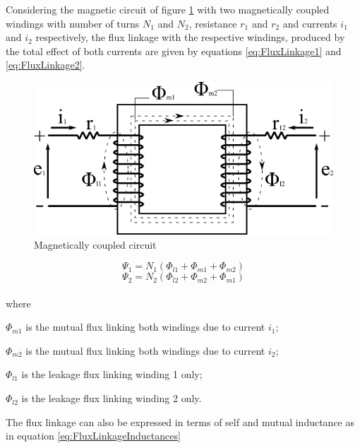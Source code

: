 Considering the magnetic circuit of figure \ref{fig:MagneticCircuit} with two magnetically coupled windings with number of turns $N_1$ and $N_2$, resistance $r_1$ and $r_2$ and currents $i_1$ and $i_2$ respectively, the flux linkage with the respective windings, produced by the total effect of both currents are given by equations \ref{eq:FluxLinkage1} and \ref{eq:FluxLinkage2}.

\begin{figure}[h]
	\centering
	\includegraphics[scale=0.6]{img/MagneticCircuit.png} 
	\caption{Magnetically coupled circuit}
	\label{fig:MagneticCircuit}
\end{figure}

\begin{equation} \label{eq:FluxLinkage1}
	\Psi_1 = N_1(\Phi_{l1} + \Phi_{m1} + \Phi_{m2})
\end{equation}
\begin{equation} \label{eq:FluxLinkage2}
	\Psi_2 = N_2(\Phi_{l2} + \Phi_{m2} + \Phi_{m1})
\end{equation}
\\
where

$\Phi_{m1}$ is the mutual flux linking both windings due to current $i_1$;

$\Phi_{m2}$ is the mutual flux linking both windings due to current $i_2$;

$\Phi_{l1}$ is the leakage flux linking winding 1 only;

$\Phi_{l2}$ is the leakage flux linking winding 2 only.

The flux linkage can also be expressed in terms of self and mutual inductance as in equation \ref{eq:FluxLinkageInductances}

